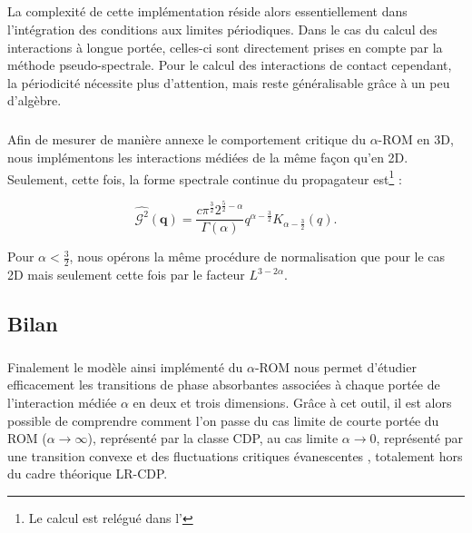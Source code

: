 \subparagraph{}La complexité de cette implémentation réside alors essentiellement dans l'intégration des conditions aux limites périodiques. Dans le cas du calcul des interactions à longue portée, celles-ci sont directement prises en compte par la méthode pseudo-spectrale. Pour le calcul des interactions de contact cependant, la périodicité nécessite plus d'attention, mais reste généralisable grâce à un peu d'algèbre. 


\subparagraph{}Afin de mesurer de manière annexe le comportement critique du $\alpha$-ROM en 3D, nous implémentons les interactions médiées de la même façon qu'en 2D. Seulement, cette fois, la forme spectrale continue du propagateur est\footnote{Le calcul est relégué dans l'} :


\begin{equation}
	\hat{\mathcal{G}^2}(\mathbf{q}) = \frac{c\pi^\frac{3}{2}2^{\frac{5}{2}-\alpha}}{\Gamma (\alpha)}q^{\alpha-\frac{3}{2}}K_{\alpha-\frac{3}{2}}(q).
\end{equation}

\noindent Pour $\alpha < \frac{3}{2}$, nous opérons la même procédure de normalisation que pour le cas 2D mais seulement cette fois par le facteur $L^{3-2\alpha}$.

\subsection*{Bilan}

\subparagraph{}Finalement le modèle ainsi implémenté du $\alpha$-ROM nous permet d'étudier efficacement les transitions de phase absorbantes associées à chaque portée de l'interaction médiée $\alpha$ en deux et trois dimensions. Grâce à cet outil, il est alors possible de comprendre comment l'on passe du cas limite de courte portée du ROM ($\alpha\rightarrow\infty$), représenté par la classe CDP, au cas limite $\alpha \rightarrow 0$, représenté par une transition convexe et des fluctuations critiques évanescentes \cite{mari_absorbing_2022}, totalement hors du cadre théorique LR-CDP.


